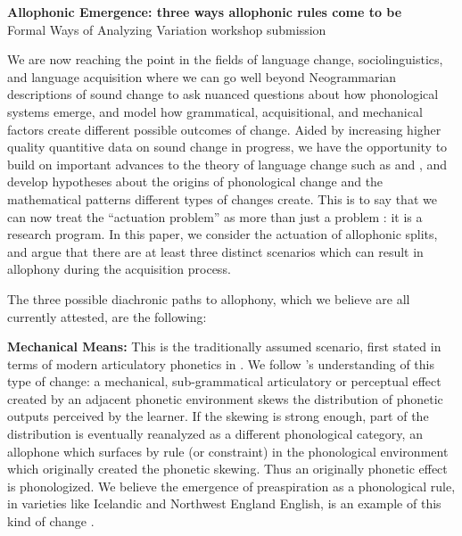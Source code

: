 \documentclass[a4paper,aps,prl,12pt,tightenlines,superscriptaddress]{revtex4}
\title{}
\begin{document}
\begin{center} \textbf{Allophonic Emergence: three ways allophonic rules come to be} \\
 Formal Ways of Analyzing Variation workshop submission
 \end{center}



We are now reaching the point in the fields of language change, sociolinguistics, and language acquisition where we can go well beyond Neogrammarian descriptions of sound change to ask nuanced questions about how phonological systems emerge, and model how grammatical, acquisitional, and mechanical factors create different possible outcomes of change. Aided by increasing higher quality quantitive data on sound change in progress, we have the opportunity to build on important advances to the theory of language change such as \citet{kiparsky1995b} and \citet{labov1994}, and develop hypotheses about the origins of phonological change and the mathematical patterns different types of changes create. This is to say that we can now treat the ``actuation problem'' as more than just a problem \citep{wlh1968}: it is a research program. In this paper, we consider the actuation of allophonic splits, and argue that there are at least three distinct scenarios which can result in allophony during the acquisition process.

The three possible diachronic paths to allophony, which we believe are all currently attested, are the following:

\textbf{Mechanical Means:} This is the traditionally assumed scenario, first stated in terms of modern articulatory phonetics in \citet{ohala1983, ohala1989}. We follow \citet[][and previous work]{bermudezotero2014}'s understanding of this type of change: a mechanical, sub-grammatical articulatory or perceptual effect created by an adjacent phonetic environment skews the distribution of phonetic outputs perceived by the learner. If the skewing is strong enough, part of the distribution is eventually reanalyzed as a different phonological category, an allophone which surfaces by rule (or constraint) in the phonological environment which originally created the phonetic skewing. Thus an originally phonetic effect is phonologized. We believe the emergence of preaspiration as a phonological rule, in varieties like Icelandic and Northwest England English, is an example of this kind of change \citep{Hejna2014}.
\end{document}
